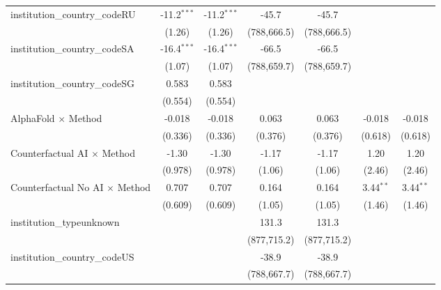 \begin{tabular}{lcccccc}
   institution\_country\_codeRU          & -11.2$^{***}$ & -11.2$^{***}$ & -45.7       & -45.7       &               &   \\   
                                         & (1.26)        & (1.26)        & (788,666.5) & (788,666.5) &               &   \\   
   institution\_country\_codeSA          & -16.4$^{***}$ & -16.4$^{***}$ & -66.5       & -66.5       &               &   \\   
                                         & (1.07)        & (1.07)        & (788,659.7) & (788,659.7) &               &   \\   
   institution\_country\_codeSG          & 0.583         & 0.583         &             &             &               &   \\   
                                         & (0.554)       & (0.554)       &             &             &               &   \\   
   AlphaFold $\times$ Method             & -0.018        & -0.018        & 0.063       & 0.063       & -0.018        & -0.018\\   
                                         & (0.336)       & (0.336)       & (0.376)     & (0.376)     & (0.618)       & (0.618)\\   
   Counterfactual AI $\times$ Method     & -1.30         & -1.30         & -1.17       & -1.17       & 1.20          & 1.20\\   
                                         & (0.978)       & (0.978)       & (1.06)      & (1.06)      & (2.46)        & (2.46)\\   
   Counterfactual No AI $\times$ Method  & 0.707         & 0.707         & 0.164       & 0.164       & 3.44$^{**}$   & 3.44$^{**}$\\   
                                         & (0.609)       & (0.609)       & (1.05)      & (1.05)      & (1.46)        & (1.46)\\   
   institution\_typeunknown              &               &               & 131.3       & 131.3       &               &   \\   
                                         &               &               & (877,715.2) & (877,715.2) &               &   \\   
   institution\_country\_codeUS          &               &               & -38.9       & -38.9       &               &   \\   
                                         &               &               & (788,667.7) & (788,667.7) &               &   \\   

\end{tabular}
